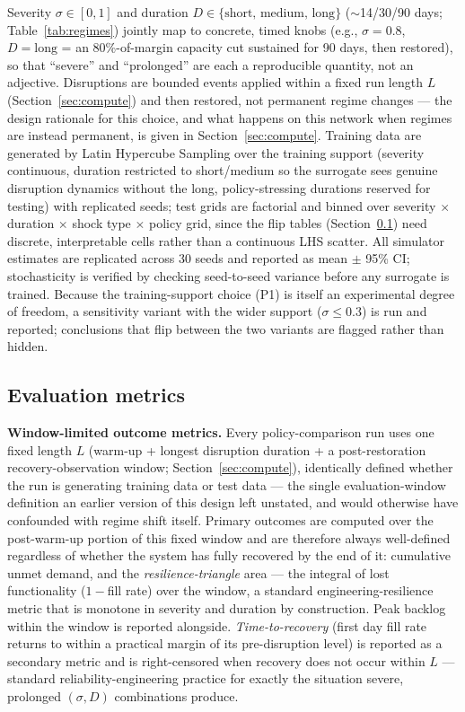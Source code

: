 \documentclass[12pt,a4paper]{article}
\begin{document}
Severity $\sigma \in [0,1]$ and duration $D \in \{\text{short, medium, long}\}$ ($\sim$14/30/90 days; Table~\ref{tab:regimes}) jointly map to concrete, timed knobs (e.g., $\sigma=0.8$, $D=\text{long}$ = an 80\%-of-margin capacity cut sustained for 90 days, then restored), so that ``severe'' and ``prolonged'' are each a reproducible quantity, not an adjective. Disruptions are bounded events applied within a fixed run length $L$ (Section~\ref{sec:compute}) and then restored, not permanent regime changes --- the design rationale for this choice, and what happens on this network when regimes are instead permanent, is given in Section~\ref{sec:compute}. Training data are generated by Latin Hypercube Sampling over the training support (severity continuous, duration restricted to short/medium so the surrogate sees genuine disruption dynamics without the long, policy-stressing durations reserved for testing) with replicated seeds; test grids are factorial and binned over severity $\times$ duration $\times$ shock type $\times$ policy grid, since the flip tables (Section~\ref{sec:metrics}) need discrete, interpretable cells rather than a continuous LHS scatter. All simulator estimates are replicated across 30 seeds and reported as mean $\pm$ 95\% CI; stochasticity is verified by checking seed-to-seed variance before any surrogate is trained. Because the training-support choice (P1) is itself an experimental degree of freedom, a sensitivity variant with the wider support ($\sigma \leq 0.3$) is run and reported; conclusions that flip between the two variants are flagged rather than hidden.

\subsection{Evaluation metrics}\label{sec:metrics}

\textbf{Window-limited outcome metrics.} Every policy-comparison run uses one fixed length $L$ (warm-up + longest disruption duration + a post-restoration recovery-observation window; Section~\ref{sec:compute}), identically defined whether the run is generating training data or test data --- the single evaluation-window definition an earlier version of this design left unstated, and would otherwise have confounded with regime shift itself. Primary outcomes are computed over the post-warm-up portion of this fixed window and are therefore always well-defined regardless of whether the system has fully recovered by the end of it: cumulative unmet demand, and the \emph{resilience-triangle} area \citep{bruneau2003,henry2012} --- the integral of lost functionality ($1-$fill rate) over the window, a standard engineering-resilience metric that is monotone in severity and duration by construction. Peak backlog within the window is reported alongside. \emph{Time-to-recovery} (first day fill rate returns to within a practical margin of its pre-disruption level) is reported as a secondary metric and is right-censored when recovery does not occur within $L$ --- standard reliability-engineering practice \citep{henry2012} for exactly the situation severe, prolonged $(\sigma,D)$ combinations produce.
\end{document}
